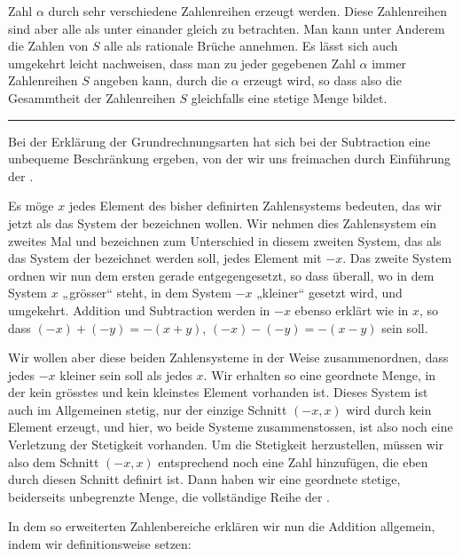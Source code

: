Zahl $\alpha$ durch sehr verschiedene Zahlenreihen erzeugt werden.
Diese Zahlenreihen sind aber alle als unter einander gleich zu
betrachten. Man kann unter Anderem die Zahlen von $S$ alle als
rationale Brüche annehmen. Es lässt sich auch umgekehrt leicht
nachweisen, dass man zu jeder gegebenen Zahl $\alpha$ immer
Zahlenreihen $S$ angeben kann, durch die $\alpha$ erzeugt wird, so dass
also die Gesammtheit der Zahlenreihen $S$ gleichfalls eine stetige
Menge bildet.

\begin{center}
\rule{0.18\linewidth}{0.4pt}
\end{center}

Bei der Erklärung der Grundrechnungsarten hat sich bei der Subtraction
eine unbequeme Beschränkung ergeben, von der wir uns freimachen durch
Einführung der .

Es möge $x$ jedes Element des bisher definirten Zahlensystems
bedeuten, das wir jetzt als das System der 
bezeichnen wollen. Wir nehmen dies Zahlensystem ein zweites Mal und
bezeichnen zum Unterschied in diesem zweiten System, das als das
System der  bezeichnet werden soll, jedes
Element mit $-x$. Das zweite System ordnen wir nun dem ersten gerade
entgegengesetzt, so dass überall, wo in dem System $x$ „grösser“
steht, in dem System $-x$ „kleiner“ gesetzt wird, und umgekehrt.
Addition und Subtraction werden in $-x$ ebenso erklärt wie in $x$, so
dass $(-x)+(-y)=-(x+y)$, $(-x)-(-y)=-(x-y)$ sein soll.

Wir wollen aber diese beiden Zahlensysteme in der Weise zusammenordnen,
dass jedes $-x$ kleiner sein soll als jedes $x$. Wir erhalten so eine
geordnete Menge, in der kein grösstes und kein kleinstes Element
vorhanden ist. Dieses System ist auch im Allgemeinen stetig, nur der
einzige Schnitt $(-x,x)$ wird durch kein Element erzeugt, und hier, wo
beide Systeme zusammenstossen, ist also noch eine Verletzung der
Stetigkeit vorhanden. Um die Stetigkeit herzustellen, müssen wir also
dem Schnitt $(-x,x)$ entsprechend noch eine Zahl 
hinzufügen, die eben durch diesen Schnitt definirt ist. Dann haben wir
eine geordnete stetige, beiderseits unbegrenzte Menge, die vollständige
Reihe der .

In dem so erweiterten Zahlenbereiche erklären wir nun die Addition
allgemein, indem wir definitionsweise setzen:
